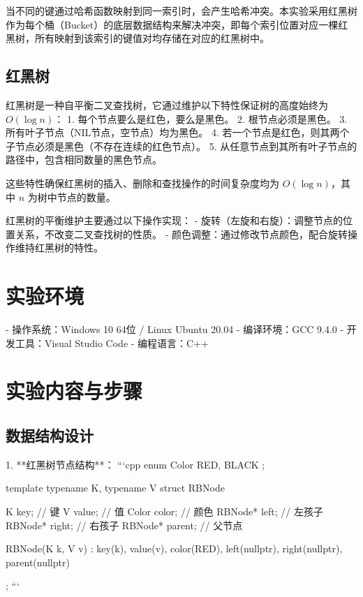 \documentclass[12pt,a4paper]{article}
\begin{document}
当不同的键通过哈希函数映射到同一索引时，会产生哈希冲突。本实验采用红黑树作为每个桶（Bucket）的底层数据结构来解决冲突，即每个索引位置对应一棵红黑树，所有映射到该索引的键值对均存储在对应的红黑树中。

\subsection{红黑树}
红黑树是一种自平衡二叉查找树，它通过维护以下特性保证树的高度始终为 \(O(\log n)\)：
1. 每个节点要么是红色，要么是黑色。
2. 根节点必须是黑色。
3. 所有叶子节点（NIL节点，空节点）均为黑色。
4. 若一个节点是红色，则其两个子节点必须是黑色（不存在连续的红色节点）。
5. 从任意节点到其所有叶子节点的路径中，包含相同数量的黑色节点。

这些特性确保红黑树的插入、删除和查找操作的时间复杂度均为 \(O(\log n)\)，其中 \(n\) 为树中节点的数量。

红黑树的平衡维护主要通过以下操作实现：
- 旋转（左旋和右旋）：调整节点的位置关系，不改变二叉查找树的性质。
- 颜色调整：通过修改节点颜色，配合旋转操作维持红黑树的特性。

\section{实验环境}
- 操作系统：Windows 10 64位 / Linux Ubuntu 20.04
- 编译环境：GCC 9.4.0
- 开发工具：Visual Studio Code
- 编程语言：C++

\section{实验内容与步骤}
\subsection{数据结构设计}
1. **红黑树节点结构**：
```cpp
enum Color { RED, BLACK };

template \<typename K, typename V\>
struct RBNode {
    K key;          // 键
    V value;        // 值
    Color color;    // 颜色
    RBNode* left;   // 左孩子
    RBNode* right;  // 右孩子
    RBNode* parent; // 父节点

    RBNode(K k, V v) : key(k), value(v), color(RED), 
                      left(nullptr), right(nullptr), parent(nullptr) {}
};
```
\end{document}
